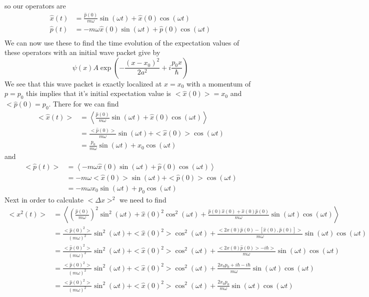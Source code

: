 \documentclass[11pt]{article}
\numberwithin{equation}{section}
\begin{document}
so our operators are
\begin{align*}
\hat{x}(t) &= \frac{\hat{p}(0)}{m\omega}\sin(\omega{t}) + \hat{x}(0)\cos(\omega{t})\\
\hat{p}(t) &= -m\omega\hat{x}(0)\sin(\omega{t}) + \hat{p}(0)\cos(\omega{t})\\
\end{align*}
We can now use these to find the time evolution of the expectation values of these operators
with an initial wave packet give by
$$\psi(x) A\exp\left(-\frac{(x-x_0)^2}{2a^2}+i\frac{p_0x}{\hbar}\right)$$
We see that this wave packet is exactly localized at $x=x_0$ with a momentum of $p=p_0$ this
implies that it's initial expectation value is $<\hat{x}(0)> = x_0$ and $<\hat{p}(0) = p_0$.
There for we can find
\begin{align*}
<\hat{x}(t)> &= \left<\frac{\hat{p}(0)}{m\omega}\sin(\omega{t}) + \hat{x}(0)\cos(\omega{t})\right>\\ 
&= \frac{<\hat{p}(0)>}{m\omega}\sin(\omega{t}) + <\hat{x}(0)>\cos(\omega{t})\\
&= \frac{p_0}{m\omega}\sin(\omega{t}) + x_0\cos(\omega{t})
\end{align*}
and
\begin{align*}
<\hat{p}(t)> &= \left<-m\omega\hat{x}(0)\sin(\omega{t}) + \hat{p}(0)\cos(\omega{t})\right>\\
&= -m\omega<\hat{x}(0)>\sin(\omega{t}) + <\hat{p}(0)>\cos(\omega{t})\\
&= -m\omega{x_0}\sin(\omega{t}) + p_0\cos(\omega{t})
\end{align*}
Next in order to calculate $<\Delta{x}>^2$ we need to find
\begin{align*}
<x^2(t)> &= \left<\left(\frac{\hat{p}(0)}{m\omega}\right)^2\sin^2(\omega{t}) + \hat{x}(0)^2\cos^2(\omega{t}) + \frac{\hat{p}(0)\hat{x}(0)+\hat{x}(0)\hat{p}(0)}{m\omega}\sin(\omega{t})\cos(\omega{t})\right>\\
&= \frac{<\hat{p}(0)^2>}{(m\omega)^2}\sin^2(\omega{t}) + <\hat{x}(0)^2>\cos^2(\omega{t}) + \frac{<2\hat{x}(0)\hat{p}(0)- [\hat{x}(0),\hat{p}(0)]>}{m\omega}\sin(\omega{t})\cos(\omega{t})\\
&= \frac{<\hat{p}(0)^2>}{(m\omega)^2}\sin^2(\omega{t}) + <\hat{x}(0)^2>\cos^2(\omega{t}) + \frac{<2\hat{x}(0)\hat{p}(0)> - i\hbar>}{m\omega}\sin(\omega{t})\cos(\omega{t})\\
&= \frac{<\hat{p}(0)^2>}{(m\omega)^2}\sin^2(\omega{t}) + <\hat{x}(0)^2>\cos^2(\omega{t}) + \frac{2x_0p_0 + i\hbar - i\hbar}{m\omega}\sin(\omega{t})\cos(\omega{t})\\
&= \frac{<\hat{p}(0)^2>}{(m\omega)^2}\sin^2(\omega{t}) + <\hat{x}(0)^2>\cos^2(\omega{t}) + \frac{2x_0p_0}{m\omega}\sin(\omega{t})\cos(\omega{t})\\
\end{align*}
\end{document}
